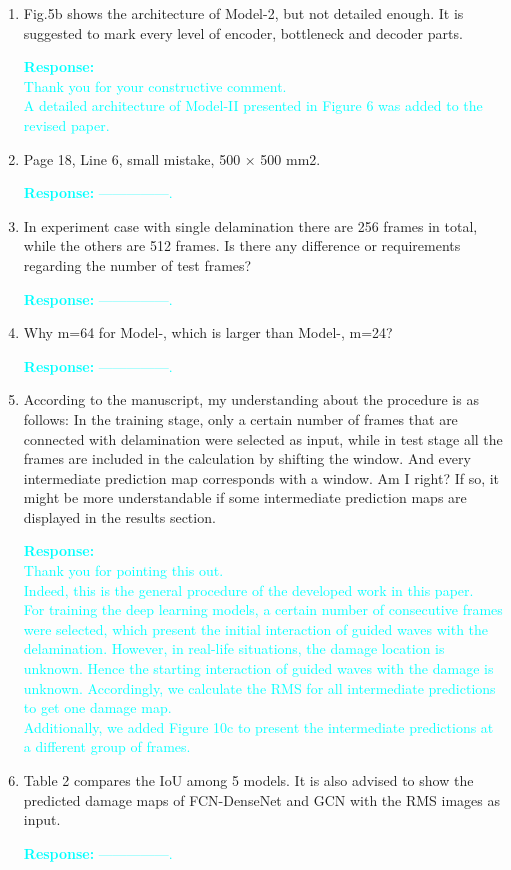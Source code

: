\documentclass[11pt,a2paper]{report}
\newcommand{\RNum}[1]{\uppercase\expandafter{\romannumeral #1\relax}}
\begin{document}
\begin{enumerate}
	\item Fig.5b shows the architecture of Model-2, but not detailed enough. It 
	is suggested to mark every level of encoder, bottleneck and decoder parts.
	
	\textcolor{Cyan}{
		\textbf{Response:} \\
		Thank you for your constructive comment.\\
		A detailed architecture of Model-II presented in Figure 6 was added to the revised paper.
	}
	
	\item Page 18, Line 6, small mistake, 500 × 500 mm2.
	
	\textcolor{Cyan}{
		\textbf{Response:}
		---------------.
	}	

	\item In experiment case with single delamination there are 256 frames in 
	total, while the others are 512 frames. Is there any difference or 
	requirements regarding the number of test frames?

\textcolor{Cyan}{
	\textbf{Response:}
	---------------.
}

	\item Why m=64 for Model-\RNum{1}, which is larger than Model-\RNum{2}, 
	m=24?

\textcolor{Cyan}{
	\textbf{Response:}
	---------------.
}

	\item According to the manuscript, my understanding about the procedure is 
	as follows: In the training stage, only a certain number of frames that are 
	connected with delamination were selected as input, while in test stage all 
	the frames are included in the calculation by shifting the window. And 
	every intermediate prediction map corresponds with a window. Am I right? If 
	so, it might be more understandable if some intermediate prediction maps 
	are displayed in the results section.

\textcolor{Cyan}{
	\textbf{Response:} \\
	Thank you for pointing this out. \\
	Indeed, this is the general procedure of the developed work in this paper.\\
	For training the deep learning models, a certain number of consecutive frames were selected, which present the initial interaction of guided waves with the delamination.
	However, in real-life situations, the damage location is unknown.
	Hence the starting interaction of guided waves with the damage is unknown.
	Accordingly, we calculate the RMS for all intermediate predictions to get one damage map. \\
	Additionally, we added Figure 10c to present the intermediate predictions at a different group of frames.
}

	\item Table 2 compares the IoU among 5 models. It is also advised to show 
	the predicted damage maps of FCN-DenseNet and GCN with the RMS images as 
	input.

\textcolor{Cyan}{
	\textbf{Response:}
	---------------.
}

\end{enumerate}	
\end{document}
